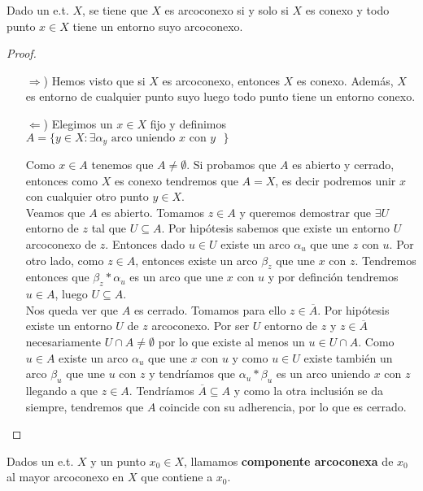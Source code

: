 \begin{teo}
    Dado un e.t. $X$, se tiene que $X$ es arcoconexo si y solo si $X$ es conexo y todo punto $x\in X$ tiene un entorno suyo arcoconexo.

    \begin{proof}\
        \begin{itemize}
            \item[$\Rightarrow$)] Hemos visto que si $X$ es arcoconexo, entonces $X$ es conexo. Además, $X$ es entorno de cualquier punto suyo luego todo punto tiene un entorno conexo.
            \item[$\Leftarrow$)] Elegimos un $x\in X$ fijo y definimos $A = \{y\in X : \exists \alpha_y \text{ arco uniendo $x$ con $y$ }\}$
            
            Como $x\in A$ tenemos que $A\neq \emptyset$. Si probamos que $A$ es abierto y cerrado, entonces como $X$ es conexo tendremos que $A=X$, es decir podremos unir $x$ con cualquier otro punto $y\in X$.\\

            Veamos que $A$ es abierto. Tomamos $z\in A$ y queremos demostrar que $\exists U$ entorno de $z$ tal que $U\subseteq A$. Por hipótesis sabemos que existe un entorno $U$ arcoconexo de $z$. Entonces dado $u\in U$ existe un arco $\alpha_u$ que une $z$ con $u$. Por otro lado, como $z\in A$, entonces existe un arco $\beta_z$ que une $x$ con $z$. Tendremos entonces que $\beta_z\ast\alpha_u$ es un arco que une $x$ con $u$ y por definción tendremos $u\in A$, luego $U\subseteq A$.\\
            
            Nos queda ver que $A$ es cerrado. Tomamos para ello $z\in \overline{A}$. Por hipótesis existe un entorno $U$ de $z$ arcoconexo. Por ser $U$ entorno de $z$ y $z\in \overline{A}$ necesariamente $U\cap A \neq \emptyset$ por lo que existe al menos un $u\in U \cap A$. Como $u\in A$ existe un arco $\alpha_u$ que une $x$ con $u$ y como $u\in U$ existe también un arco $\beta_u$ que une $u$ con $z$ y tendríamos que $\alpha_u\ast\beta_u$ es un arco uniendo $x$ con $z$ llegando a que $z\in A$. Tendríamos $\overline{A}\subseteq A$ y como la otra inclusión se da siempre, tendremos que $A$ coincide con su adherencia, por lo que es cerrado.
        \end{itemize}
    \end{proof}
\end{teo}

\begin{definicion}
    Dados un e.t. $X$ y un punto $x_0\in X$, llamamos \textbf{componente arcoconexa} de $x_0$ al mayor arcoconexo en $X$ que contiene a $x_0$.
\end{definicion}

